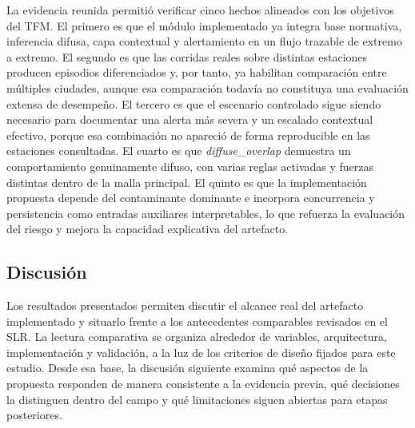 La evidencia reunida permitió verificar cinco hechos alineados con los objetivos del TFM. El primero es que el módulo implementado ya integra base normativa, inferencia difusa, capa contextual y alertamiento en un flujo trazable de extremo a extremo. El segundo es que las corridas reales sobre distintas estaciones producen episodios diferenciados y, por tanto, ya habilitan comparación entre múltiples ciudades, aunque esa comparación todavía no constituya una evaluación extensa de desempeño. El tercero es que el escenario controlado sigue siendo necesario para documentar una alerta más severa y un escalado contextual efectivo, porque esa combinación no apareció de forma reproducible en las estaciones consultadas. El cuarto es que \textit{diffuse\_overlap} demuestra un comportamiento genuinamente difuso, con varias reglas activadas y fuerzas distintas dentro de la malla principal. El quinto es que la implementación propuesta depende del contaminante dominante e incorpora concurrencia y persistencia como entradas auxiliares interpretables, lo que refuerza la evaluación del riesgo y mejora la capacidad explicativa del artefacto.

\subsection{Discusión}

Los resultados presentados permiten discutir el alcance real del artefacto implementado y situarlo frente a los antecedentes comparables revisados en el SLR. La lectura comparativa se organiza alrededor de variables, arquitectura, implementación y validación, a la luz de los criterios de diseño fijados para este estudio. Desde esa base, la discusión siguiente examina qué aspectos de la propuesta responden de manera consistente a la evidencia previa, qué decisiones la distinguen dentro del campo y qué limitaciones siguen abiertas para etapas posteriores.

